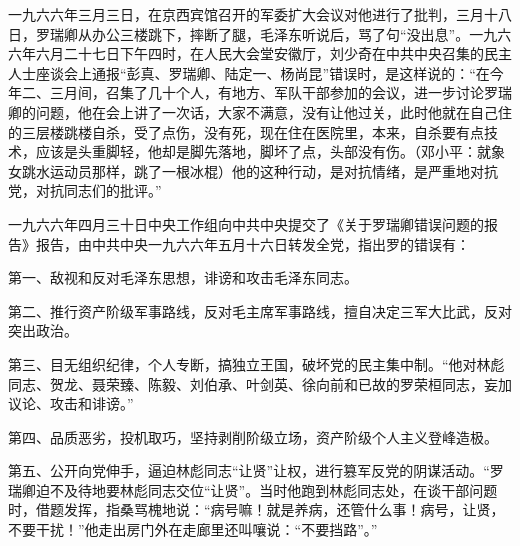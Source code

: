 \begin{maonote}
一九六六年三月三日，在京西宾馆召开的军委扩大会议对他进行了批判，三月十八日，罗瑞卿从办公三楼跳下，摔断了腿，毛泽东听说后，骂了句“没出息”。一九六六年六月二十七日下午四时，在人民大会堂安徽厅，刘少奇在中共中央召集的民主人士座谈会上通报“彭真、罗瑞卿、陆定一、杨尚昆”错误时，是这样说的：“在今年二、三月间，召集了几十个人，有地方、军队干部参加的会议，进一步讨论罗瑞卿的问题，他在会上讲了一次话，大家不满意，没有让他过关，此时他就在自己住的三层楼跳楼自杀，受了点伤，没有死，现在住在医院里，本来，自杀要有点技术，应该是头重脚轻，他却是脚先落地，脚坏了点，头部没有伤。（邓小平：就象女跳水运动员那样，跳了一根冰棍）他的这种行动，是对抗情绪，是严重地对抗党，对抗同志们的批评。”

一九六六年四月三十日中央工作组向中共中央提交了《关于罗瑞卿错误问题的报告》报告，由中共中央一九六六年五月十六日转发全党，指出罗的错误有：

第一、敌视和反对毛泽东思想，诽谤和攻击毛泽东同志。

第二、推行资产阶级军事路线，反对毛主席军事路线，擅自决定三军大比武，反对突出政治。

第三、目无组织纪律，个人专断，搞独立王国，破坏党的民主集中制。“他对林彪同志、贺龙、聂荣臻、陈毅、刘伯承、叶剑英、徐向前和已故的罗荣桓同志，妄加议论、攻击和诽谤。”

第四、品质恶劣，投机取巧，坚持剥削阶级立场，资产阶级个人主义登峰造极。

第五、公开向党伸手，逼迫林彪同志“让贤”让权，进行篡军反党的阴谋活动。“罗瑞卿迫不及待地要林彪同志交位“让贤”。当时他跑到林彪同志处，在谈干部问题时，借题发挥，指桑骂槐地说：“病号嘛！就是养病，还管什么事！病号，让贤，不要干扰！”他走出房门外在走廊里还叫嚷说：“不要挡路”。”
\end{maonote}
